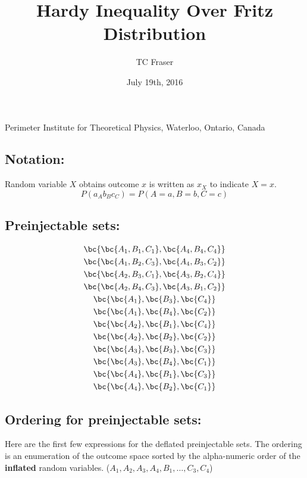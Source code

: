 \documentclass{article}
\begin{document}
    \title{Hardy Inequality Over Fritz Distribution}
    \author{TC Fraser}{Perimeter Institute for Theoretical Physics, Waterloo, Ontario, Canada}
    \date{July 19th, 2016}

    \subsection*{Notation:} Random variable $X$ obtains outcome $x$ is written as $x_X$ to indicate $X = x$.
    \[ P(a_Ab_Bc_C) = P(A = a, B = b, C = c) \]

    \subsection*{Preinjectable sets:}

    \begin{gather*}
        \bc{\bc{A_1, B_1, C_1}, \bc{A_4, B_4, C_4}} \\
        \bc{\bc{A_1, B_2, C_3}, \bc{A_4, B_3, C_2}} \\
        \bc{\bc{A_2, B_3, C_1}, \bc{A_3, B_2, C_4}} \\
        \bc{\bc{A_2, B_4, C_3}, \bc{A_3, B_1, C_2}} \\
        \bc{\bc{A_1}, \bc{B_3}, \bc{C_4}} \\
        \bc{\bc{A_1}, \bc{B_4}, \bc{C_2}} \\
        \bc{\bc{A_2}, \bc{B_1}, \bc{C_4}} \\
        \bc{\bc{A_2}, \bc{B_2}, \bc{C_2}} \\
        \bc{\bc{A_3}, \bc{B_3}, \bc{C_3}} \\
        \bc{\bc{A_3}, \bc{B_4}, \bc{C_1}} \\
        \bc{\bc{A_4}, \bc{B_1}, \bc{C_3}} \\
        \bc{\bc{A_4}, \bc{B_2}, \bc{C_1}}
    \end{gather*}
    \subsection*{Ordering for preinjectable sets:} Here are the first few expressions for the deflated preinjectable sets. The ordering is an enumeration of the outcome space sorted by the alpha-numeric order of the \textbf{inflated} random variables. ($A_1, A_2, A_3, A_4, B_1, \ldots, C_3, C_4$)
\end{document}
